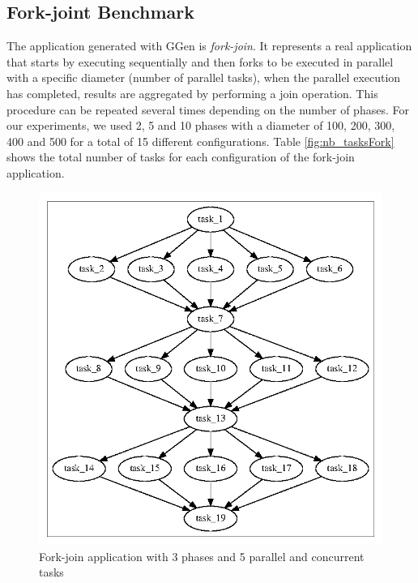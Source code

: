 \subsection{Fork-joint Benchmark}
The application generated with GGen is \emph{fork-join}. It represents a real application that starts by executing sequentially and then forks to be executed in parallel with a specific diameter (number of parallel tasks), when the parallel execution has completed, results are aggregated by performing a join operation. This procedure can be repeated several times depending on the number of phases. For our experiments, we used 2, 5 and 10 phases with a diameter of 100, 200, 300, 400 and 500 for a total of 15 different configurations. Table \ref{fig:nb_tasksFork} shows the total number of tasks for each configuration of the fork-join application.

\begin{figure}[htpb]
	\centering
    \includegraphics[scale=.5]{images/forkjoin-3-5.png}
    \caption{Fork-join application with 3 phases and 5 parallel and concurrent tasks}
    \label{fig:forkjoin}
\end{figure}



